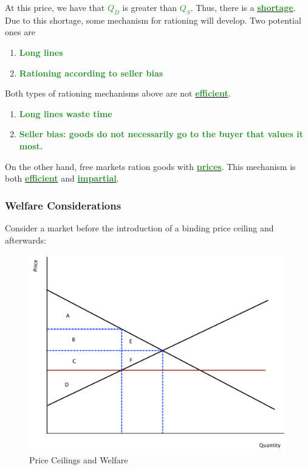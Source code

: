 \documentclass[11pt]{article}\usepackage[]{graphicx}\usepackage[]{color}
\theoremstyle{definition}
\newcommand{\ddp}[1]{{\textbf{\textcolor{ForestGreen}{#1}}}}
\newcommand{\dd}[1]{{\underline{\textbf{\textcolor{ForestGreen}{#1}}}}}
\begin{document}
	At this price, we have that \dd{$Q_D$} is greater than \dd{$Q_S$}. Thus, there is a \dd{shortage}.
	\\
	
	Due to this shortage, some mechanism for rationing will develop. Two potential ones are
	\begin{enumerate}
		\item \ddp{Long lines}
		\item \ddp{Rationing according to seller bias}
	\end{enumerate}
	

	Both types of rationing mechanisms above are not \dd{efficient}. 
	\begin{enumerate}
		\item \ddp{Long lines waste time}
		\item \ddp{Seller bias: goods do not necessarily go to the buyer that values it most.}
	\end{enumerate}
	
	On the other hand, free markets ration goods with \dd{prices}. This mechanism is both \dd{efficient} and \dd{impartial}.
	
	\subsubsection*{Welfare Considerations}
	
	
	Consider a market before the introduction of a binding price ceiling and afterwards:
	
		\begin{figure}[H]
			\centering
			\includegraphics[scale=.40]{plot36.pdf}
			\caption{Price Ceilings and Welfare}
		\end{figure}
		
\end{document}
